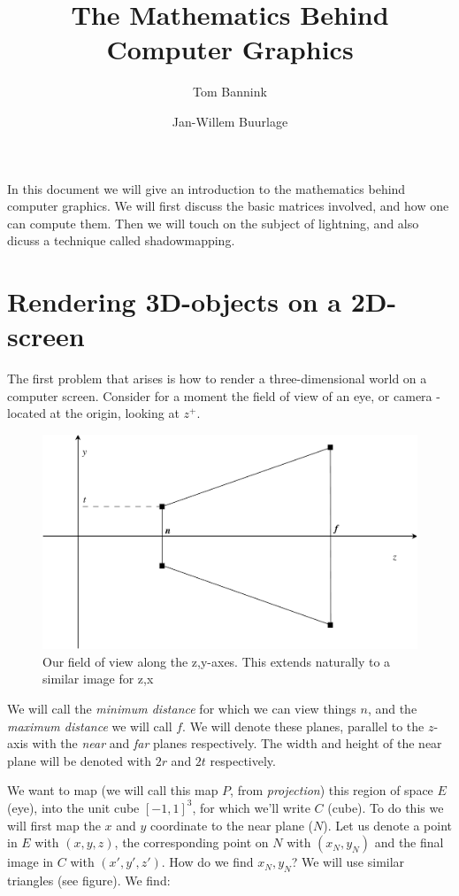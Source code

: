 \documentclass{article}
\title{The Mathematics Behind Computer Graphics}
\author{Tom Bannink \and Jan-Willem Buurlage}
\date{}
\begin{document}
\maketitle

In this document we will give an introduction to the mathematics behind computer graphics. We will first discuss the basic matrices involved, and how one can compute them. Then we will touch on the subject of lightning, and also dicuss a technique called shadowmapping.

\section{Rendering 3D-objects on a 2D-screen}

The first problem that arises is how to render a three-dimensional world on a computer screen. Consider for a moment the field of view of an eye, or camera - located at the origin, looking at $z^+$. 

\begin{figure}[h!]
	\begin{center}
	\includegraphics[width=0.8 \textwidth]{frustum-z-y.pdf}
	\caption{Our field of view along the z,y-axes. This extends naturally to a similar image for z,x}
	\end{center}
\end{figure}

We will call the \emph{minimum distance} for which we can view things $n$, and the \emph{maximum distance} we will call $f$. We will denote these planes, parallel to the $z$-axis with the \emph{near} and \emph{far} planes respectively. The width and height of the near plane will be denoted with $2r$ and $2t$ respectively. 

We want to map (we will call this map $P$, from \emph{projection}) this region of space $E$ (eye), into the unit cube $[-1, 1]^3$, for which we'll write $C$ (cube). To do this we will first map the $x$ and $y$ coordinate to the near plane ($N$). Let us denote a point in $E$ with $(x, y, z)$, the corresponding point on $N$ with $(x_N, y_N)$ and the final image in $C$ with $(x', y', z')$. How do we find $x_N, y_N$? We will use similar triangles (see figure). We find:
\end{document}
